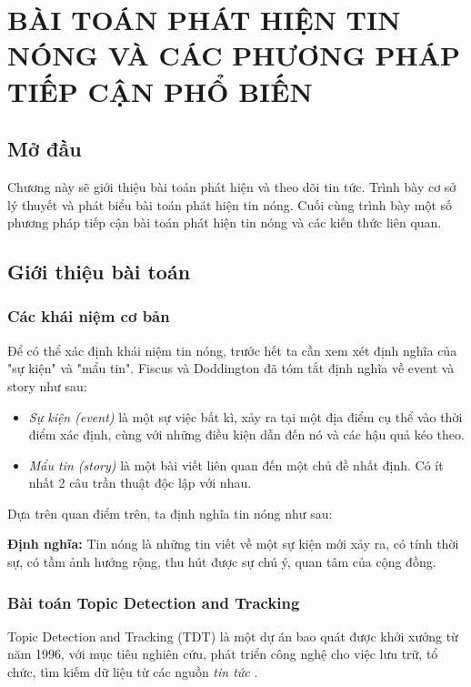 \chapter{BÀI TOÁN PHÁT HIỆN TIN NÓNG VÀ CÁC PHƯƠNG PHÁP TIẾP CẬN PHỔ BIẾN}
\ifpdf
    \graphicspath{{Chapter2/Chapter2Figs/PNG/}{Chapter2/Chapter2Figs/PDF/}{Chapter2/Chapter2Figs/}}
\else
    \graphicspath{{Chapter2/Chapter2Figs/EPS/}{Chapter2/Chapter2Figs/}}
\fi

\section{Mở đầu}
Chương này sẽ giới thiệu bài toán phát hiện và theo dõi tin tức. Trình bày cơ sở lý thuyết và phát biểu bài toán phát hiện tin nóng. Cuối cùng trình bày một số phương pháp tiếp cận bài toán phát hiện tin nóng và các kiến thức liên quan.
\section{Giới thiệu bài toán} %
	\subsection{Các khái niệm cơ bản}
	Để có thể xác định khái niệm tin nóng, trước hết ta cần xem xét định nghĩa của "sự kiện" và "mẩu tin". Fiscus và Doddington \cite{Fiscus:TDTDefinition} đã tóm tắt định nghĩa về event và story như sau:
	\begin{itemize}
		\item \textit{Sự kiện (event)} là một sự việc bất kì, xảy ra tại một địa điểm cụ thể vào thời điểm xác định, cùng với những điều kiện dẫn đến nó và các hậu quả kéo theo.
		
		\item \textit{Mẩu tin (story)} là một bài viết liên quan đến một chủ đề nhất định. Có ít nhất 2 câu trần thuật độc lập với nhau.
	\end{itemize}
	
	Dựa trên quan điểm trên, ta định nghĩa tin nóng như sau:
	
	\textbf{Định nghĩa:} Tin nóng là những tin viết về một sự kiện mới xảy ra, có tính thời sự, có tầm ảnh hưởng rộng, thu hút được sự chú ý, quan tâm của cộng đồng.

%
	\subsection{Bài toán Topic Detection and Tracking}
	Topic Detection and Tracking (TDT) là một dự án bao quát được khởi xướng từ năm 1996, với mục tiêu nghiên cứu, phát triển công nghệ cho việc lưu trữ, tổ chức, tìm kiếm dữ liệu từ các nguồn \textit{tin tức} \cite{Fiscus:TDTDefinition}.
	

